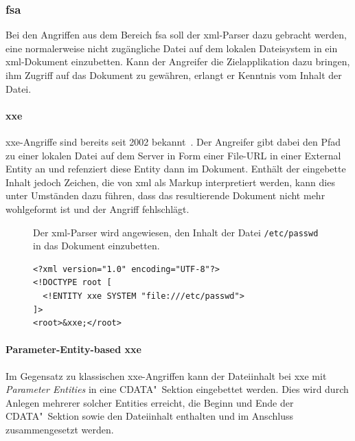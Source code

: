 \subsubsection{\acrlong{fsa}}
\label{sec:xmlattacks-fsa}
Bei den Angriffen aus dem Bereich \acrlong{fsa} soll der \acrshort{xml}-Parser dazu gebracht werden, eine normalerweise nicht zugängliche Datei auf dem lokalen Dateisystem in ein \acrshort{xml}-Dokument einzubetten. Kann der Angreifer die Zielapplikation dazu bringen, ihm Zugriff auf das Dokument zu gewähren, erlangt er Kenntnis vom Inhalt der Datei.

\paragraph{\acrfull{xxe}}
\acrshort{xxe}-Angriffe sind bereits seit 2002 bekannt~\cite{steuck2002xxe}. Der Angreifer gibt dabei den Pfad zu einer lokalen Datei auf dem Server in Form einer File-URL in einer External Entity an und refenziert diese Entity dann im Dokument. Enthält der eingebette Inhalt jedoch Zeichen, die von \acrshort{xml} als Markup interpretiert werden, kann dies unter Umständen dazu führen, dass das resultierende Dokument nicht mehr wohlgeformt ist und der Angriff fehlschlägt.~\cite[Abschnitt 5.1]{spaeth2016sok}

\begin{figure}[h!]
\begin{example} Der \acrshort{xml}-Parser wird angewiesen, den Inhalt der Datei \texttt{/etc/passwd} in das Dokument einzubetten.
    \begin{verbatim}
<?xml version="1.0" encoding="UTF-8"?>
<!DOCTYPE root [
  <!ENTITY xxe SYSTEM "file:///etc/passwd">
]>
<root>&xxe;</root>
    \end{verbatim}
\end{example}
\end{figure}

\paragraph{Parameter-Entity-based \acrfull{xxe}} Im Gegensatz zu klassischen \acrshort{xxe}-Angriffen kann der Dateiinhalt bei \gls{xxe} mit \emph{Parameter Entities} in eine CDATA"~Sektion eingebettet werden. Dies wird durch Anlegen mehrerer solcher Entities erreicht, die Beginn und Ende der CDATA"~Sektion sowie den Dateiinhalt enthalten und im Anschluss zusammengesetzt werden.~\cite[S.~10]{morgan2014xml}

